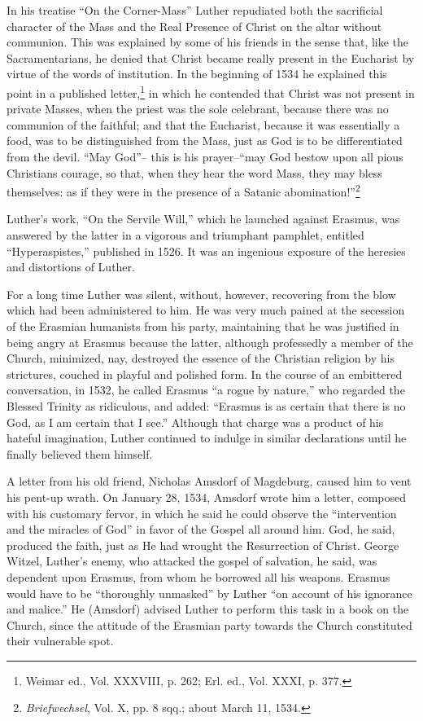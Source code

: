 In his treatise “On the Corner-Mass” Luther repudiated both the
sacrificial character of the Mass and the Real Presence of Christ on
the altar without communion. This was explained by some of his
friends in the sense that, like the Sacramentarians, he denied that
Christ became really present in the Eucharist by virtue of the words
of institution. In the beginning of 1534 he explained this point
in a published letter,\footnote{Weimar ed., Vol. XXXVIII, p. 262; Erl. ed., Vol. XXXI, p. 377.}
 in which he contended that Christ was not
present in private Masses, when the priest was the sole celebrant, because
there was no communion of the faithful; and that the Eucharist,
because it was essentially a food, was to be distinguished from the
Mass, just as God is to be differentiated from the devil. “May God”--
this is his prayer--“may God bestow upon all pious Christians courage,
so that, when they hear the word Mass, they may bless themselves:
as if they were in the presence of a Satanic abomination!”\footnote{\textit{Briefwechsel}, Vol. X, pp. 8 sqq.; about March 11, 1534.}


Luther’s work, “On the Servile Will,” which he launched against
Erasmus, was answered by the latter in a vigorous and triumphant
pamphlet, entitled “Hyperaspistes,” published in 1526. It was an ingenious
exposure of the heresies and distortions of Luther.

For a long time Luther was silent, without, however, recovering from
the blow which had been administered to him. He was very much pained at
the secession of the Erasmian humanists from his party, maintaining that he
was justified in being angry at Erasmus because the latter, although professedly
a member of the Church, minimized, nay, destroyed the essence of
the Christian religion by his strictures, couched in playful and polished form.
In the course of an embittered conversation, in 1532, he called Erasmus “a
rogue by nature,” who regarded the Blessed Trinity as ridiculous, and added:
“Erasmus is as certain that there is no God, as I am certain that I see.”
Although that charge was a product of his hateful imagination, Luther
continued to indulge in similar declarations until he finally believed
them himself.

A letter from his old friend, Nicholas Amsdorf of Magdeburg, caused him
to vent his pent-up wrath. On January 28, 1534, Amsdorf wrote him a
letter, composed with his customary fervor, in which he said he could
observe the “intervention and the miracles of God” in favor of the Gospel
all around him. God, he said, produced the faith, just as He had wrought
the Resurrection of Christ. George Witzel, Luther’s enemy, who attacked
the gospel of salvation, he said, was dependent upon Erasmus, from whom
he borrowed all his weapons. Erasmus would have to be “thoroughly unmasked”
by Luther “on account of his ignorance and malice.” He (Amsdorf)
advised Luther to perform this task in a book on the Church, since
the attitude of the Erasmian party towards the Church constituted their
vulnerable spot.

